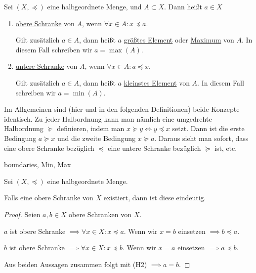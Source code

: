 \begin{definition}
    \label{def-upper-boundary}
    Sei $(X, \preceq)$ eine halbgeordnete Menge, und $A \subset X$. Dann heißt $a \in X$
    \begin{enumerate}
        \item \underline{obere Schranke} von $A$, wenn $\forall x \in A: x \preceq a$.
        
        Gilt zusätzlich $a \in A$, dann heißt $a$ \underline{größtes Element} oder \underline{Maximum} von $A$. In diesem Fall schreiben wir $a = \max(A)$.
        \item \underline{untere Schranke} von $A$, wenn $\forall x \in A: a \preceq x$.
        
        Gilt zusätzlich $a \in A$, dann heißt $a$ \underline{kleinstes Element} von $A$. In diesem Fall schreiben wir $a = \min(A)$.
    \end{enumerate}
\end{definition}

\begin{remark}
    Im Allgemeinen sind (hier und in den folgenden Definitionen) beide Konzepte identisch. Zu jeder Halbordnung kann man nämlich eine umgedrehte Halbordnung $\succeq$ definieren, indem man $x \succeq y \iff y \preceq x$ setzt. Dann ist die erste Bedingung $a \succeq x$ und die zweite Bedingung $x \succeq a$. Daraus sieht man sofort, dass eine obere Schranke bezüglich $\preceq$ eine untere Schranke bezüglich $\succeq$ ist, etc.
\end{remark}

\begin{example}
    boundaries, Min, Max
\end{example}

\begin{lemma}[lemma]
    \label{lem-upper-bound-unique}
    Sei $(X, \preceq)$ eine halbgeordnete Menge.
    
    Falls eine obere Schranke von $X$ existiert, dann ist diese eindeutig.
\end{lemma}
\begin{proof}
    Seien $a, b \in X$ obere Schranken von $X$.

    $a$ ist obere Schranke $\implies \forall x \in X: x \preceq a$. Wenn wir $x = b$ einsetzen $\implies b \preceq a$.
    
    $b$ ist obere Schranke $\implies \forall x \in X: x \preceq b$. Wenn wir $x = a$ einsetzen $\implies a \preceq b$.

    Aus beiden Aussagen zusammen folgt mit (H2) $\implies a = b$.
\end{proof}

